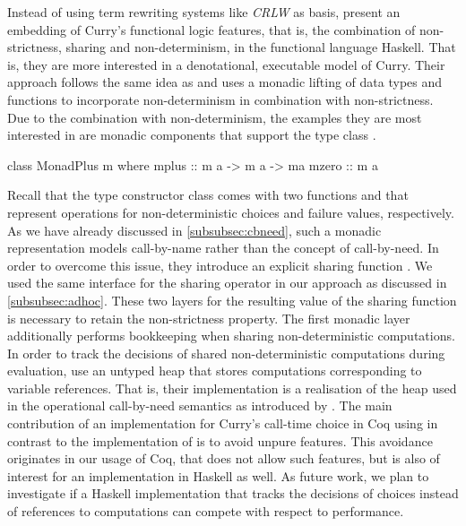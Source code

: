 Instead of using term rewriting systems like \emph{CRLW} as basis, \citet{fischer2009purely} present an embedding of Curry's functional logic features, that is, the combination of non\--strictness, sharing and non\--determinism, in the functional language Haskell.
That is, they are more interested in a denotational, executable model of Curry.
Their approach follows the same idea as \citet{abel2005verifying} and uses a monadic lifting of data types and functions to incorporate non\--determinism in combination with non\--strictness.
Due to the combination with non\--determinism, the examples they are most interested in are monadic components that support the type class .

\begin{haskellcode}
class MonadPlus m where
  mplus :: m a -> m a -> ma
  mzero :: m a
\end{haskellcode}

Recall that the type constructor class  comes with two functions  and  that represent operations for non\--deterministic choices and failure values, respectively.
As we have already discussed in \autoref{subsubsec:cbneed}, such a monadic representation models call\--by\--name rather than the concept of call\--by\--need.
In order to overcome this issue, they introduce an explicit sharing function .
We used the same interface for the sharing operator in our approach as discussed in \autoref{subsubsec:adhoc}.
These two layers for the resulting value of the sharing function is necessary to retain the non\--strictness property.
The first monadic layer additionally performs bookkeeping when sharing non\--deterministic computations.
In order to track the decisions of shared non\--deterministic computations during evaluation, \citeauthor{fischer2009purely} use an untyped heap that stores computations corresponding to variable references.
That is, their implementation is a realisation of the heap used in the operational call\--by\--need semantics as introduced by \citet{launchbury1993natural}.
The main contribution of an implementation for Curry's call\--time choice in Coq using  in contrast to the implementation of \citeauthor{fischer2009purely} is to avoid unpure features.
This avoidance originates in our usage of Coq, that does not allow such features, but is also of interest for an implementation in Haskell as well.
As future work, we plan to investigate if a Haskell implementation that tracks the decisions of choices instead of references to computations can compete with respect to performance.

